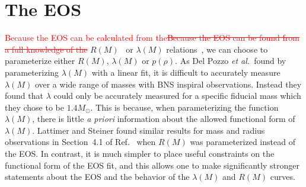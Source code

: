 \documentclass[twocolumn,prd,amssymb,aps,nofootinbib,showpacs,epsf]{revtex4}
\newcommand\ben[2]{\textcolor{red}{{#1}\sout{#2}}}
\begin{document}
%

\section{The EOS}
\label{sec:eos}

\ben{Because the EOS can be calculated from the}{Because the EOS can be found from a full knowledge of the} $R(M)$~\cite{Lindblom1992} or $\lambda(M)$ relations~\cite{LindblomIndik2012, LindblomIndik2014}, we can choose to parameterize either $R(M)$, $\lambda(M)$ or $p(\rho)$. As Del Pozzo {\it et al.}\ found by parameterizing $\lambda(M)$ with a linear fit, it is difficult to accurately measure $\lambda(M)$ over a wide range of masses with BNS inspiral observations. Instead they found that $\lambda$ could only be accurately measured for a specific fiducial mass which they chose to be $1.4M_\odot$. This is because, when parameterizing the function $\lambda(M)$, there is little {\it a priori} information about the allowed functional form of $\lambda(M)$. Lattimer and Steiner found similar results for mass and radius observations in Section~4.1 of Ref.~\cite{LattimerSteiner2014} when $R(M)$ was parameterized instead of the EOS. In contrast, it is much simpler to place useful constraints on the functional form of the EOS fit, and this allows one to make significantly stronger statements about the EOS and the behavior of the $\lambda(M)$ and $R(M)$ curves.
\end{document}
